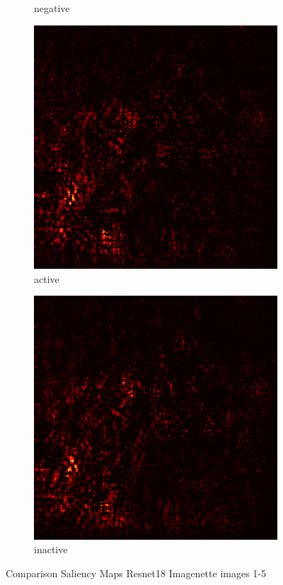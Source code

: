 \documentclass[preprint,12pt]{elsarticle}
\begin{document}
\begin{figure}
\begin{subfigure}{0.14\textwidth}
        \caption{negative}
    \end{subfigure}
    \hfill
    \begin{subfigure}{0.14\textwidth}
        \centering
        \includegraphics[width=\linewidth]{../visualizations/examples/imagenette/resnet18/active_saliency_map/4.png}
        \caption{active}
    \end{subfigure}
    \hfill
    \begin{subfigure}{0.14\textwidth}
        \centering
        \includegraphics[width=\linewidth]{../visualizations/examples/imagenette/resnet18/inactive_saliency_map/4.png}
        \caption{inactive}
    \end{subfigure}
    \hfill
    \caption{Comparison Saliency Maps Resnet18 Imagenette images 1-5}
\end{figure}
\end{document}
